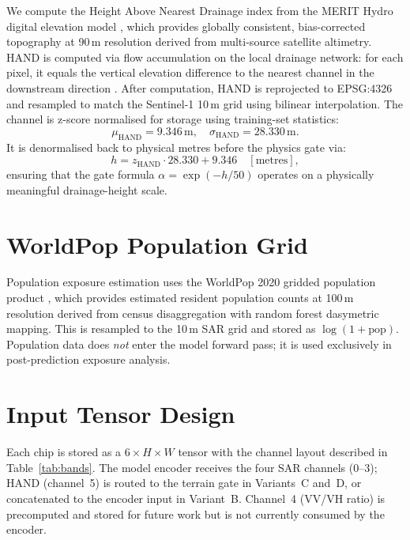 \documentclass[12pt,oneside]{report}
\begin{document}
We compute the Height Above Nearest Drainage index from the MERIT Hydro
digital elevation model \cite{yamazaki2019merit}, which provides globally
consistent, bias-corrected topography at 90\,m resolution derived from
multi-source satellite altimetry.
HAND is computed via flow accumulation on the local drainage network: for each
pixel, it equals the vertical elevation difference to the nearest channel in
the downstream direction \cite{renno2008hand}.
After computation, HAND is reprojected to EPSG:4326 and resampled to match the
Sentinel-1 10\,m grid using bilinear interpolation.
The channel is z-score normalised for storage using training-set statistics:
\begin{equation}
  \mu_\text{HAND} = 9.346\,\text{m}, \quad
  \sigma_\text{HAND} = 28.330\,\text{m}.
  \label{eq:hand_stats}
\end{equation}
It is denormalised back to physical metres before the physics gate via:
\begin{equation}
  h = z_\text{HAND} \cdot 28.330 + 9.346 \quad [\text{metres}],
  \label{eq:hand_denorm}
\end{equation}
ensuring that the gate formula $\alpha = \exp(-h/50)$ operates on a physically
meaningful drainage-height scale.

\section{WorldPop Population Grid}

Population exposure estimation uses the WorldPop 2020 gridded population
product \cite{stevens2015disaggregating}, which provides estimated resident
population counts at 100\,m resolution derived from census disaggregation with
random forest dasymetric mapping.
This is resampled to the 10\,m SAR grid and stored as $\log(1 + \mathrm{pop})$.
Population data does \emph{not} enter the model forward pass; it is used
exclusively in post-prediction exposure analysis.

\section{Input Tensor Design}

Each chip is stored as a $6 \times H \times W$ tensor with the channel layout
described in Table~\ref{tab:bands}.
The model encoder receives the four SAR channels (0--3); HAND (channel~5) is
routed to the terrain gate in Variants~C and~D, or concatenated to the encoder
input in Variant~B.
Channel~4 (VV/VH ratio) is precomputed and stored for future work but is not
currently consumed by the encoder.
\end{document}
